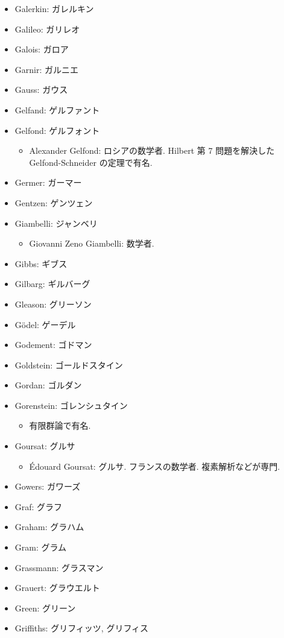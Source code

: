 \documentclass[openany, a4paper, oneside]{jsbook}
\begin{document}
\begin{itemize}
\item Galerkin: ガレルキン
\item Galileo: ガリレオ
\item Galois: ガロア
\item Garnir: ガルニエ
\item Gauss: ガウス
\item Gelfand: ゲルファント
\item Gelfond: ゲルフォント
\begin{itemize}
\item Alexander Gelfond: ロシアの数学者. Hilbert 第 7 問題を解決した Gelfond-Schneider の定理で有名.
\end{itemize}
\item Germer: ガーマー
\item Gentzen: ゲンツェン
\item Giambelli: ジャンベリ
\begin{itemize}
\item Giovanni Zeno Giambelli: 数学者.
\end{itemize}
\item Gibbs: ギブス
\item Gilbarg: ギルバーグ
\item Gleason: グリーソン
\item G\"odel: ゲーデル
\item Godement: ゴドマン
\item Goldstein: ゴールドスタイン
\item Gordan: ゴルダン
\item Gorenstein: ゴレンシュタイン
\begin{itemize}
\item 有限群論で有名.
\end{itemize}
\item Goursat: グルサ
\begin{itemize}
\item \'Edouard Goursat: グルサ. フランスの数学者. 複素解析などが専門.
\end{itemize}
\item Gowers: ガワーズ
\item Graf: グラフ
\item Graham: グラハム
\item Gram: グラム
\item Grassmann: グラスマン
\item Grauert: グラウエルト
\item Green: グリーン
\item Griffiths: グリフィッツ, グリフィス

\end{itemize}
\end{document}
